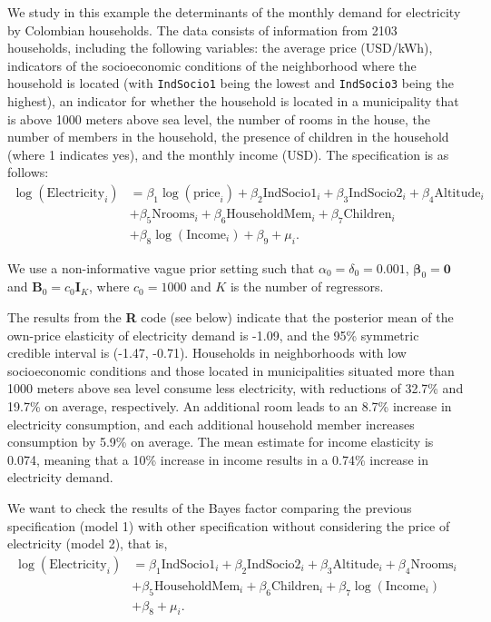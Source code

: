 We study in this example the determinants of the monthly demand for electricity by Colombian households. The data consists of information from 2103 households, including the following variables: the average price (USD/kWh), indicators of the socioeconomic conditions of the neighborhood where the household is located (with \texttt{IndSocio1} being the lowest and \texttt{IndSocio3} being the highest), an indicator for whether the household is located in a municipality that is above 1000 meters above sea level, the number of rooms in the house, the number of members in the household, the presence of children in the household (where 1 indicates yes), and the monthly income (USD). The specification is as follows:
\begin{align*}
	\log(\text{Electricity}_i) & = \beta_1\log(\text{price}_i) + \beta_2\text{IndSocio1}_i + \beta_3\text{IndSocio2}_i + \beta_4\text{Altitude}_i \\
	& + \beta_5\text{Nrooms}_i + \beta_6\text{HouseholdMem}_i + \beta_7\text{Children}_i\\
	& + \beta_8\log(\text{Income}_i) + \beta_9 + \mu_i.
\end{align*}

We use a non-informative vague prior setting such that $\alpha_0=\delta_0=0.001$, $\bm{\beta}_0=\bm{0}$ and $\bm{B}_0=c_0\bm{I}_K$, where $c_0=1000$ and $K$ is the number of regressors. 

The results from the \textbf{R} code (see below) indicate that the posterior mean of the own-price elasticity of electricity demand is -1.09, and the 95\% symmetric credible interval is (-1.47, -0.71). Households in neighborhoods with low socioeconomic conditions and those located in municipalities situated more than 1000 meters above sea level consume less electricity, with reductions of 32.7\% and 19.7\% on average, respectively. An additional room leads to an 8.7\% increase in electricity consumption, and each additional household member increases consumption by 5.9\% on average. The mean estimate for income elasticity is 0.074, meaning that a 10\% increase in income results in a 0.74\% increase in electricity demand.

We want to check the results of the Bayes factor comparing the previous specification (model 1) with other specification without considering the price of electricity (model 2), that is,
\begin{align*}
	\log(\text{Electricity}_i) & = \beta_1\text{IndSocio1}_i + \beta_2\text{IndSocio2}_i + \beta_3\text{Altitude}_i + \beta_4\text{Nrooms}_i\\
	& + \beta_5\text{HouseholdMem}_i + \beta_6\text{Children}_i + \beta_7\log(\text{Income}_i)\\
	& + \beta_8 + \mu_i.
\end{align*}

